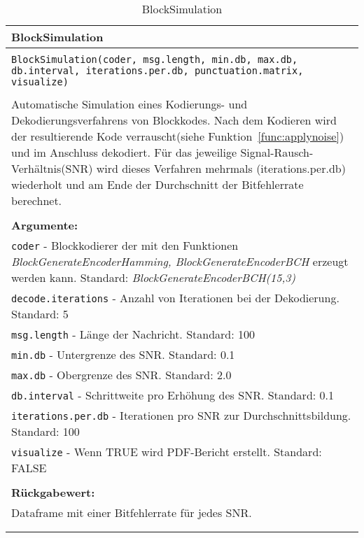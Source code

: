 \begin{longtable}{|p{\textwidth}|}
\hline
\rowcolor{lightblue}BlockSimulation\\
\hline
\\
\texttt{BlockSimulation(coder, msg.length, min.db, max.db, db.interval, iterations.per.db, punctuation.matrix, visualize)}\\
\\
Automatische Simulation eines Kodierungs- und Dekodierungsverfahrens von Blockkodes. Nach dem Kodieren wird der resultierende Kode verrauscht(siehe Funktion~\ref{func:applynoise}) und im Anschluss dekodiert. Für das jeweilige Signal-Rausch-Verhältnis(SNR) wird dieses Verfahren mehrmals (iterations.per.db) wiederholt und am Ende der Durchschnitt der Bitfehlerrate berechnet.\\
\\
\textbf{Argumente:}\\
\texttt{coder} - Blockkodierer der mit den Funktionen \emph{BlockGenerateEncoderHamming, BlockGenerateEncoderBCH} erzeugt werden kann. Standard: \emph{BlockGenerateEncoderBCH(15,3)}\\
\texttt{decode.iterations} - Anzahl von Iterationen bei der Dekodierung. Standard: 5\\
\texttt{msg.length} - Länge der Nachricht. Standard: 100\\
\texttt{min.db} - Untergrenze des SNR. Standard: 0.1\\
\texttt{max.db} - Obergrenze des SNR. Standard: 2.0\\
\texttt{db.interval} - Schrittweite pro Erhöhung des SNR. Standard: 0.1\\
\texttt{iterations.per.db} - Iterationen pro SNR zur Durchschnittsbildung. Standard: 100\\
\texttt{visualize} - Wenn TRUE wird PDF-Bericht erstellt. Standard: FALSE\\
\\
\textbf{Rückgabewert:}\\
Dataframe mit einer Bitfehlerrate für jedes SNR.\\
\\
\hline
\caption{BlockSimulation}
\label{func:block_simu}
\end{longtable}
